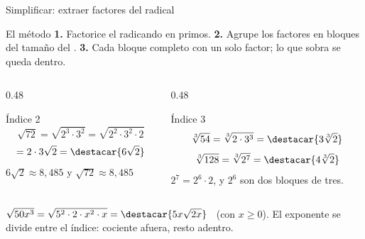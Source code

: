 \documentclass[aspectratio=169,10pt]{beamer}
\begin{document}
\begin{frame}{Simplificar: extraer factores del radical}
  \scriptsize
  \begin{block}{El método}
    \tiny
    \textbf{1.} Factorice el radicando en primos. \quad
    \textbf{2.} Agrupe los factores en bloques del tamaño del .
    \quad
    \textbf{3.} Cada bloque completo  con un solo factor; lo
    que sobra se queda dentro.
  \end{block}

  \vspace{0.1cm}
  \begin{columns}[T,onlytextwidth]
    \begin{column}{0.48\textwidth}
      \begin{exampleblock}{Índice 2}
        \tiny
        \[ \sqrt{72} = \sqrt{2^{3}\cdot 3^{2}}
           = \sqrt{2^{2}\cdot 3^{2}\cdot 2} \]
        \[ = 2\cdot 3\sqrt{2} = \destacar{6\sqrt{2}} \]
         $6\sqrt{2}\approx 8{,}485$ y
        $\sqrt{72}\approx 8{,}485$ \checkmark
      \end{exampleblock}
    \end{column}
    \begin{column}{0.48\textwidth}
      \begin{exampleblock}{Índice 3}
        \tiny
        \[ \sqrt[3]{54} = \sqrt[3]{2\cdot 3^{3}}
           = \destacar{3\sqrt[3]{2}} \]
        \[ \sqrt[3]{128} = \sqrt[3]{2^{7}}
           = \destacar{4\sqrt[3]{2}} \]
        {\color{uniGris}$2^{7}=2^{6}\cdot 2$, y $2^{6}$ son dos bloques de
        tres.}
      \end{exampleblock}
    \end{column}
  \end{columns}

  \vspace{0.08cm}
  {\tiny\color{uniGris} 
  $\sqrt{50x^{3}} = \sqrt{5^{2}\cdot 2\cdot x^{2}\cdot x}
  = \destacar{5x\sqrt{2x}}$ \ (con $x\ge 0$). El exponente se divide entre el
  índice: cociente afuera, resto adentro.}
\end{frame}
\end{document}
